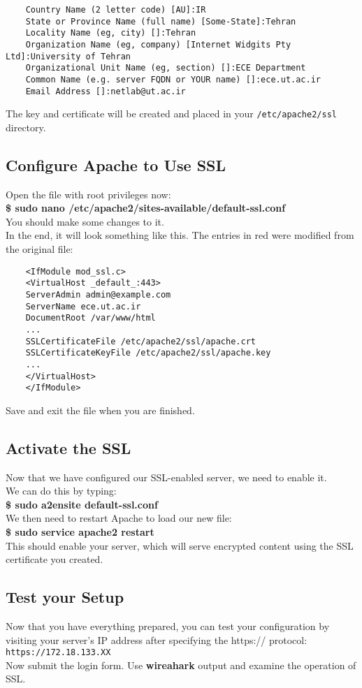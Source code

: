 \documentclass[10pt,a4paper]{article}
\numberwithin{equation}{section}
\numberwithin{figure}{section}
\numberwithin{table}{section}
\begin{document}
	\begin{verbatim}
	Country Name (2 letter code) [AU]:IR 
	State or Province Name (full name) [Some-State]:Tehran 
	Locality Name (eg, city) []:Tehran 
	Organization Name (eg, company) [Internet Widgits Pty Ltd]:University of Tehran 
	Organizational Unit Name (eg, section) []:ECE Department 
	Common Name (e.g. server FQDN or YOUR name) []:ece.ut.ac.ir 
	Email Address []:netlab@ut.ac.ir 
	\end{verbatim}
	The key and certificate will be created and placed in your \texttt{/etc/apache2/ssl} directory.
	\subsection{Configure Apache to Use SSL}
	Open the file with root privileges now:\\
	\textbf{\$ sudo nano /etc/apache2/sites-available/default-ssl.conf} \\
	You should make some changes to it. \\
	In the end, it will look something like this. The entries in red were modified from the original file: \\
	\begin{verbatim}
	<IfModule mod_ssl.c>
	<VirtualHost _default_:443>
	ServerAdmin admin@example.com
	ServerName ece.ut.ac.ir 
	DocumentRoot /var/www/html
	...
	SSLCertificateFile /etc/apache2/ssl/apache.crt
	SSLCertificateKeyFile /etc/apache2/ssl/apache.key
	...
	</VirtualHost>
	</IfModule>
	\end{verbatim}
	Save and exit the file when you are finished.
	\subsection{Activate the SSL}
	Now that we have configured our SSL-enabled server, we need to enable it. \\
	We can do this by typing: \\
	\textbf{\$ sudo a2ensite default-ssl.conf} \\
	We then need to restart Apache to load our new file:\\
	\textbf{\$ sudo service apache2 restart} \\
	This should enable your server, which will serve encrypted content using the SSL certificate you created.
	\subsection{Test your Setup}
	Now that you have everything prepared, you can test your configuration by visiting your server's IP address after specifying the https:// protocol: \\
	\texttt{https://172.18.133.XX} \\
	Now submit the login form.
	Use \textbf{wireahark} output and examine the operation of SSL.
	
\end{document}
